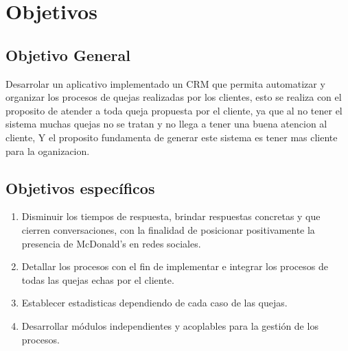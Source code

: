 \chapter{Objetivos}
\section{Objetivo General}
Desarrolar un aplicativo implementado un CRM que permita automatizar y organizar los procesos de quejas realizadas por los clientes, esto se realiza con el proposito de atender a toda queja propuesta por el cliente, ya que al no tener el sistema muchas quejas no se tratan y no llega a tener una buena atencion al cliente, Y el proposito fundamenta de generar este sistema es tener mas cliente para la oganizacion.%
\section{Objetivos espec\'ificos}
\begin{enumerate}
\item Disminuir los tiempos de respuesta, brindar respuestas concretas y que cierren conversaciones, con la finalidad de posicionar positivamente la presencia de McDonald’s en redes sociales.
\item Detallar los procesos con el fin de implementar e integrar los procesos de todas las quejas echas por el cliente.%
\item Establecer estadisticas dependiendo de cada caso de las quejas.
\item Desarrollar m\'odulos independientes y acoplables para la gesti\'on de los procesos.
\end{enumerate}